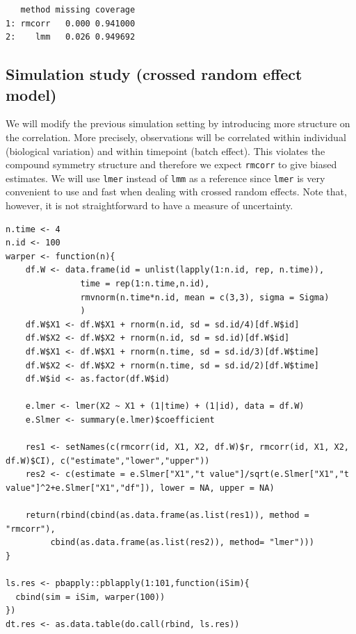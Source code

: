 \documentclass[12pt]{article}
\begin{document}
\begin{verbatim}
   method missing coverage
1: rmcorr   0.000 0.941000
2:    lmm   0.026 0.949692
\end{verbatim}

\subsection{Simulation study (crossed random effect model)}
\label{sec:org7c69bed}

We will modify the previous simulation setting by introducing more
structure on the correlation. More precisely, observations will be
correlated within individual (biological variation) and within
timepoint (batch effect). This violates the compound symmetry
structure and therefore we expect \texttt{rmcorr} to give biased
estimates. We will use \texttt{lmer} instead of \texttt{lmm} as a reference since
\texttt{lmer} is very convenient to use and fast when dealing with crossed
random effects. Note that, however, it is not straightforward to have a
measure of uncertainty.

\lstset{language=r,label= ,caption= ,captionpos=b,numbers=none}
\begin{lstlisting}
n.time <- 4
n.id <- 100
warper <- function(n){
    df.W <- data.frame(id = unlist(lapply(1:n.id, rep, n.time)),
		       time = rep(1:n.time,n.id),
		       rmvnorm(n.time*n.id, mean = c(3,3), sigma = Sigma)
		       )
    df.W$X1 <- df.W$X1 + rnorm(n.id, sd = sd.id/4)[df.W$id]
    df.W$X2 <- df.W$X2 + rnorm(n.id, sd = sd.id)[df.W$id]
    df.W$X1 <- df.W$X1 + rnorm(n.time, sd = sd.id/3)[df.W$time]
    df.W$X2 <- df.W$X2 + rnorm(n.time, sd = sd.id/2)[df.W$time]
    df.W$id <- as.factor(df.W$id)

    e.lmer <- lmer(X2 ~ X1 + (1|time) + (1|id), data = df.W)
    e.Slmer <- summary(e.lmer)$coefficient

    res1 <- setNames(c(rmcorr(id, X1, X2, df.W)$r, rmcorr(id, X1, X2, df.W)$CI), c("estimate","lower","upper"))
    res2 <- c(estimate = e.Slmer["X1","t value"]/sqrt(e.Slmer["X1","t value"]^2+e.Slmer["X1","df"]), lower = NA, upper = NA)

    return(rbind(cbind(as.data.frame(as.list(res1)), method = "rmcorr"),
		 cbind(as.data.frame(as.list(res2)), method= "lmer")))
}

ls.res <- pbapply::pblapply(1:101,function(iSim){
  cbind(sim = iSim, warper(100))
})
dt.res <- as.data.table(do.call(rbind, ls.res))
\end{lstlisting}
\end{document}
